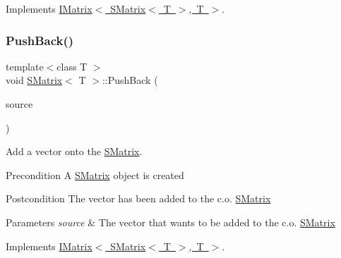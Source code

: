 Implements \mbox{\hyperlink{class_i_matrix_a1ed62ee6700728045083c7f0df3e3e62}{I\+Matrix$<$ S\+Matrix$<$ T $>$, T $>$}}.

\mbox{\label{class_s_matrix_a245ee5844619467dd4ef2a3525a3aa52}} 
\subsubsection{\texorpdfstring{PushBack()}{PushBack()}}
{\footnotesize\ttfamily template$<$class T $>$ \\
void \mbox{\hyperlink{class_s_matrix}{S\+Matrix}}$<$ T $>$\+::Push\+Back (\begin{DoxyParamCaption}\item[{const \mbox{\hyperlink{class_my_vector}{My\+Vector}}$<$ T $>$ \&}]{source }\end{DoxyParamCaption})\hspace{0.3cm}{\ttfamily [virtual]}}



Add a vector onto the \mbox{\hyperlink{class_s_matrix}{S\+Matrix}}. 

\begin{DoxyPrecond}{Precondition}
A \mbox{\hyperlink{class_s_matrix}{S\+Matrix}} object is created 
\end{DoxyPrecond}
\begin{DoxyPostcond}{Postcondition}
The vector has been added to the c.\+o. \mbox{\hyperlink{class_s_matrix}{S\+Matrix}}
\end{DoxyPostcond}

\begin{DoxyParams}{Parameters}
{\em source} & The vector that wants to be added to the c.\+o. \mbox{\hyperlink{class_s_matrix}{S\+Matrix}} \\
\hline
\end{DoxyParams}


Implements \mbox{\hyperlink{class_i_matrix_aa5de147c7aa5b74b0f2177ed1a8158de}{I\+Matrix$<$ S\+Matrix$<$ T $>$, T $>$}}.

\mbox{\label{class_s_matrix_ad2978078bf594d7e85832cd5dcf85b6d}} 
